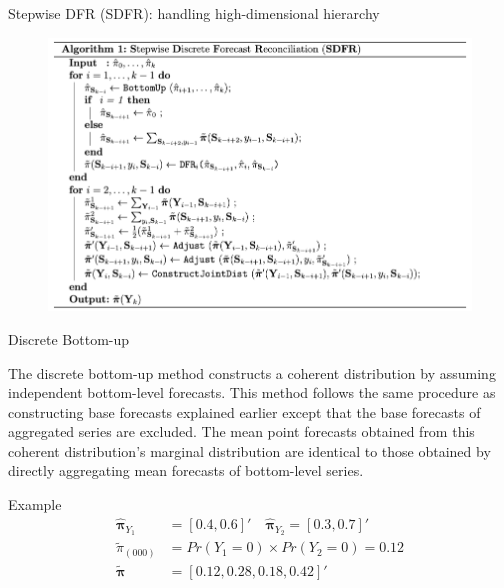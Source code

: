\documentclass[12pt]{beamer}
\begin{document}
\begin{frame}{Stepwise DFR (SDFR): handling high-dimensional hierarchy}
\begin{figure}
\centering
\includegraphics[width=\textwidth]{figures/alg_sdfr.png}
\end{figure}
\end{frame}





\begin{frame}{Discrete Bottom-up}
\begin{outline}
\1 The discrete bottom-up method constructs a coherent distribution by assuming independent bottom-level forecasts. 
\1 This method follows the same procedure as constructing base forecasts explained earlier except that the base forecasts of aggregated series are excluded.
\1 The mean point forecasts obtained from this coherent distribution’s marginal distribution are identical to those obtained by directly aggregating mean forecasts of bottom-level series.

\begin{block}{Example}  
\[
    \begin{aligned}
        \hat{\boldsymbol{\pi}}_{Y_1} &= [0.4, 0.6]'\quad \hat{\boldsymbol{\pi}}_{Y_2} = [0.3, 0.7]' \\
        \tilde{\pi}_{(000)} &= Pr(Y_1=0) \times Pr(Y_2=0) = 0.12      \\
        \tilde{\boldsymbol{\pi}} &= [0.12, 0.28, 0.18, 0.42]'
    \end{aligned}
\]
\end{block}
\end{outline}
\end{frame}
\end{document}
